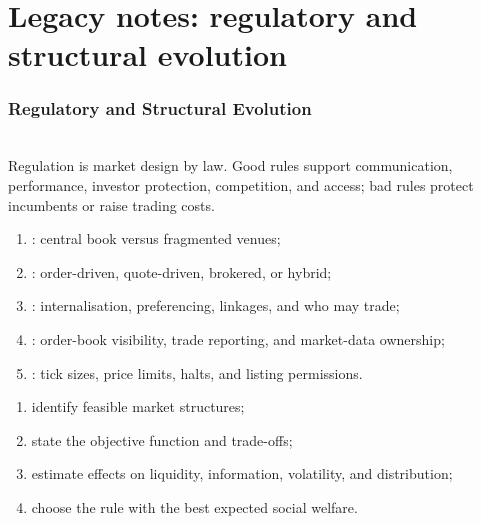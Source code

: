 \documentclass[a4paper,oneside,openany]{book}
\begin{document}
\chapter*{Legacy notes: regulatory and structural evolution}

\subsection*{Regulatory and Structural Evolution}

\begin{principle} \\
Regulation is market design by law. Good rules support communication, performance, investor protection, competition, and access; bad rules protect incumbents or raise trading costs.
\end{principle}

\begin{taxonomy} 
\begin{enumerate}[label=\roman*.]
\setlength{\itemsep}{0pt}
\item {}: central book versus fragmented venues;
\item {}: order-driven, quote-driven, brokered, or hybrid;
\item {}: internalisation, preferencing, linkages, and who may trade;
\item {}: order-book visibility, trade reporting, and market-data ownership;
\item {}: tick sizes, price limits, halts, and listing permissions.
\end{enumerate}
\end{taxonomy}

\begin{process} 
\begin{enumerate}[label=\roman*.]
\setlength{\itemsep}{0pt}
\item identify feasible market structures;
\item state the objective function and trade-offs;
\item estimate effects on liquidity, information, volatility, and distribution;
\item choose the rule with the best expected social welfare.
\end{enumerate}
\end{process}
\end{document}
